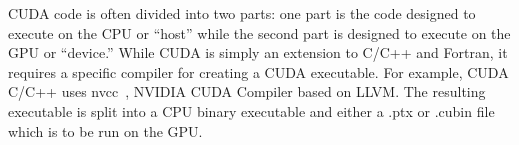 
CUDA code is often divided into two parts: one part is the code designed to
execute on the CPU or ``host'' while the second part is designed to execute on the
GPU or ``device.''  While CUDA is simply an extension to C/C++ and Fortran, it
requires a specific compiler for creating a CUDA executable. For example, CUDA C/C++ uses
nvcc~\cite{nvcc}, NVIDIA CUDA Compiler based on LLVM. The resulting executable is split into a
CPU binary executable and either a .ptx or .cubin file which is to be run on the
GPU.


